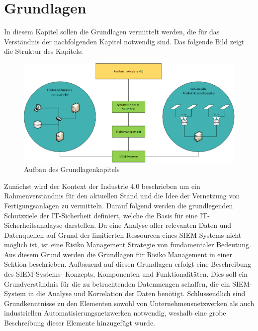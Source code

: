 \chapter{Grundlagen}
\label{cha:grundlagen}

In diesem Kapitel sollen die Grundlagen vermittelt werden, die für das Verständnis der nachfolgenden Kapitel notwendig sind. Das folgende Bild zeigt die Struktur des Kapitels:

\begin{figure}[h]
\centering
\includegraphics[width=175mm]{Zeichnungen/Grundlagenkapitel.png}
\caption{Aufbau des Grundlagenkapitels}
\label{fig:Aufbau des Grundlagenkapitels}
\end{figure}

Zunächst wird der Kontext der Industrie 4.0 beschrieben um ein Rahmenverständnis für den aktuellen Stand und die Idee der Vernetzung von Fertigungsanlagen zu vermitteln. Darauf folgend werden die grundlegenden Schutzziele der IT-Sicherheit definiert, welche die Basis für eine IT-Sicherheitsanalayse darstellen. Da eine Analyse aller relevanten Daten und Datenquellen auf Grund der limitierten Ressourcen eines SIEM-Systems nicht möglich ist, ist eine Risiko Management Strategie von fundamentaler Bedeutung. Aus diesem Grund werden die Grundlagen für Risiko Management in einer Sektion beschrieben. Aufbauend auf diesen Grundlagen erfolgt eine Beschreibung des SIEM-Systems- Konzepts, Komponenten und  Funktionalitäten. Dies soll ein Grundverständnis für die zu betrachtenden Datenmengen schaffen, die ein SIEM-System in die Analyse und Korrelation der Daten benötigt. Schlussendlich sind Grundkenntnisse zu den Elementen sowohl von Unternehmensnetzwerken als auch industriellen Automatisierungsnetzwerken notwendig, weshalb eine grobe Beschreibung dieser Elemente hinzugefügt wurde.

